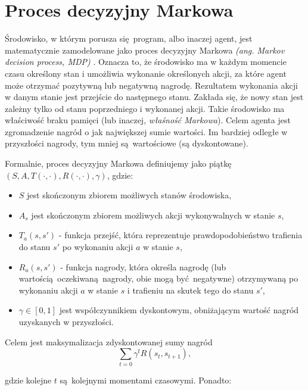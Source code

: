 \section{Proces decyzyjny Markowa}\label{mdp}

Środowisko, w którym porusza się program, albo inaczej agent, jest matematycznie zamodelowane jako proces decyzyjny Markowa \textit{(ang. Markov decision process, MDP)} \cite{bellman1954}. Oznacza to, że środowisko ma w każdym momencie czasu określony stan i umożliwia wykonanie określonych akcji, za które agent może otrzymać pozytywną lub negatywną nagrodę. Rezultatem wykonania akcji w danym stanie jest przejście do następnego stanu. Zakłada się, że nowy stan jest zależny tylko od stanu poprzedniego i wykonanej akcji. Takie środowisko ma właściwość braku pamięci (lub inaczej, \textit{właśność Markowa}). Celem agenta jest zgromadzenie nagród o jak największej sumie wartości. Im bardziej odległe w przyszłości nagrody, tym mniej są wartościowe (są dyskontowane).

\vspace{5mm}

Formalnie, proces decyzyjny Markowa definiujemy jako piątkę $(S,A,T(\cdot,\cdot),R(\cdot,\cdot),\gamma)$, gdzie:
\begin{itemize}
\item $S$ jest skończonym zbiorem możliwych stanów środowiska,
\item $A_s$ jest skończonym zbiorem możliwych akcji wykonywalnych w stanie $s$,
\item $T_a(s,s')$ - funkcja przejść, która reprezentuje prawdopodobieństwo trafienia do stanu $s'$ po wykonaniu akcji $a$ w stanie $s$,
\item $R_a(s,s')$ - funkcja nagrody, która określa nagrodę (lub wartością oczekiwaną nagrody, obie mogą być negatywne) otrzymywaną po wykonaniu akcji $a$ w stanie $s$ i trafieniu na skutek tego do stanu $s'$,
\item $\gamma \in [0,1]$ jest współczynnikiem dyskontowym, obniżającym wartość nagród uzyskanych w przyszłości.
\end{itemize}

Celem jest maksymalizacja zdyskontowanej sumy nagród $$\sum_{t=0}{\gamma^t R(s_t,s_{t+1})},$$

gdzie kolejne $t$ są kolejnymi momentami czasowymi. Ponadto:

